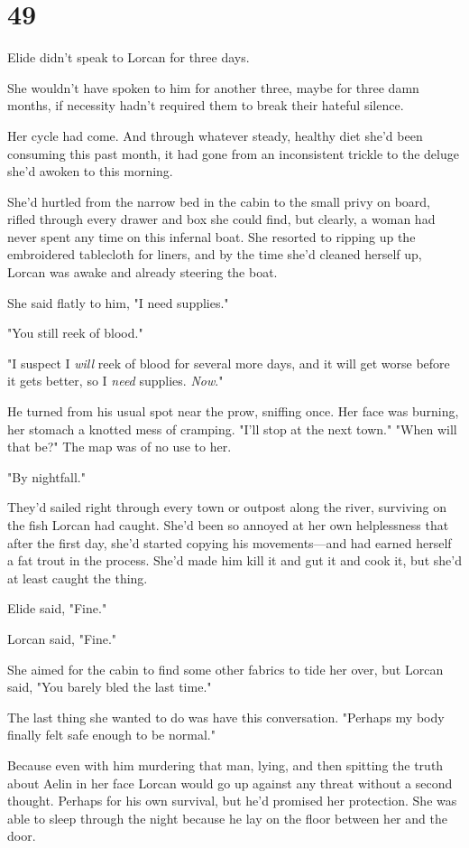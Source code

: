 
\chapter{49}

Elide didn't speak to Lorcan for three days.

She wouldn't have spoken to him for another three, maybe for three damn months, if necessity hadn't required them to break their hateful silence.

Her cycle had come. And through whatever steady, healthy diet she'd been consuming this past month, it had gone from an inconsistent trickle to the deluge she'd awoken to this morning.

She'd hurtled from the narrow bed in the cabin to the small privy on board, rifled through every drawer and box she could find, but 
clearly, a woman had never spent any time on this infernal boat. She resorted to ripping up the embroidered tablecloth for liners, and by the time she'd cleaned herself up, Lorcan was awake and already steering the boat.

She said flatly to him, "I need supplies."

"You still reek of blood."

"I suspect I \emph{will} reek of blood for several more days, and it will get worse before it gets better, so I \emph{need} supplies.
\emph{Now}."

He turned from his usual spot near the prow, sniffing once. Her face was burning, her stomach a knotted mess of cramping. "I'll stop at the next town." "When will that be?" The map was of no use to her.

"By nightfall."

They'd sailed right through every town or outpost along the river, surviving on the fish Lorcan had caught. She'd been so annoyed at her own helplessness that after the first day, she'd started copying his movements---and had earned herself a fat trout in the process. She'd made him kill it and gut it and cook it, but  she'd at least caught the thing.

Elide said, "Fine."

Lorcan said, "Fine."

She aimed for the cabin to find some other fabrics to tide her over, but Lorcan said, "You barely bled the last time."

The last thing she wanted to do was have this conversation. "Perhaps my body finally felt safe enough to be normal."

Because even with him murdering that man, lying, and then spitting the truth about Aelin in her face  Lorcan would go up against any threat without a second thought. Perhaps for his own survival, but he'd promised her protection. She was able to sleep through the night because he lay on the floor between her and the door.

